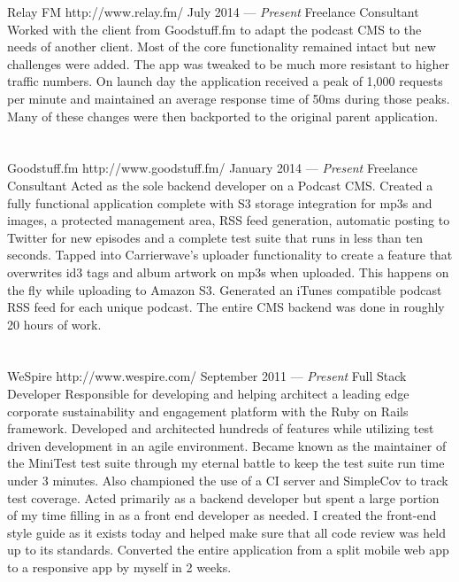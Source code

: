\documentclass{resume}
\begin{document}
\employer
	{Relay FM}
	{http://www.relay.fm/}
	{July 2014 --- \emph{Present}}
	{Freelance Consultant}
	{Worked with the client from Goodstuff.fm to adapt the podcast CMS to the needs of another client. Most of the core functionality remained intact but new challenges were added. The app was tweaked to be much more resistant to higher traffic numbers. On launch day the application received a peak of 1,000 requests per minute and maintained an average response time of 50ms during those peaks. Many of these changes were then backported to the original parent application.}
\\ \\ \\
\employer
	{Goodstuff.fm}
	{http://www.goodstuff.fm/}
	{January 2014 --- \emph{Present}}
	{Freelance Consultant}
	{Acted as the sole backend developer on a Podcast CMS. Created a fully functional application complete with S3 storage integration for mp3s and images, a protected management area, RSS feed generation, automatic posting to Twitter for new episodes and a complete test suite that runs in less than ten seconds. Tapped into Carrierwave's uploader functionality to create a feature that overwrites id3 tags and album artwork on mp3s when uploaded. This happens on the fly while uploading to Amazon S3. Generated an iTunes compatible podcast RSS feed for each unique podcast. The entire CMS backend was done in roughly 20 hours of work.}
\\ \\ \\
\employer
	{WeSpire}
	{http://www.wespire.com/}
	{September 2011 --- \emph{Present}}
	{Full Stack Developer}
	{Responsible for developing and helping architect a leading edge corporate sustainability and engagement platform with the Ruby on Rails framework. Developed and architected hundreds of features while utilizing test driven development in an agile environment. Became known as the maintainer of the MiniTest test suite through my eternal battle to keep the test suite run time under 3 minutes. Also championed the use of a CI server and SimpleCov to track test coverage. Acted primarily as a backend developer but spent a large portion of my time filling in as a front end developer as needed. I created the front-end style guide as it exists today and helped make sure that all code review was held up to its standards. Converted the entire application from a split mobile web app to a responsive app by myself in 2 weeks.}
\\ \\ \\
\end{document}
